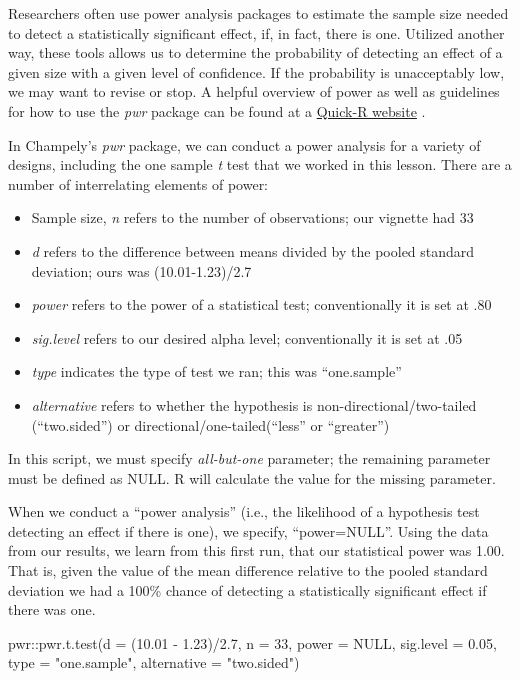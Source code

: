 \documentclass[
  11pt,
]{book}
\newenvironment{Shaded}{\begin{snugshade}}{\end{snugshade}}
\newcommand{\AttributeTok}[1]{\textcolor[rgb]{0.77,0.63,0.00}{#1}}
\newcommand{\ConstantTok}[1]{\textcolor[rgb]{0.00,0.00,0.00}{#1}}
\newcommand{\DecValTok}[1]{\textcolor[rgb]{0.00,0.00,0.81}{#1}}
\newcommand{\FloatTok}[1]{\textcolor[rgb]{0.00,0.00,0.81}{#1}}
\newcommand{\FunctionTok}[1]{\textcolor[rgb]{0.00,0.00,0.00}{#1}}
\newcommand{\NormalTok}[1]{#1}
\newcommand{\SpecialCharTok}[1]{\textcolor[rgb]{0.00,0.00,0.00}{#1}}
\newcommand{\StringTok}[1]{\textcolor[rgb]{0.31,0.60,0.02}{#1}}
\providecommand{\tightlist}{%
  \setlength{\itemsep}{0pt}\setlength{\parskip}{0pt}}
\begin{document}
Researchers often use power analysis packages to estimate the sample size needed to detect a statistically significant effect, if, in fact, there is one. Utilized another way, these tools allows us to determine the probability of detecting an effect of a given size with a given level of confidence. If the probability is unacceptably low, we may want to revise or stop. A helpful overview of power as well as guidelines for how to use the \emph{pwr} package can be found at a \href{https://www.statmethods.net/stats/power.html}{Quick-R website} \citep{kabacoff_power_2017}.

In Champely's \emph{pwr} package, we can conduct a power analysis for a variety of designs, including the one sample \emph{t} test that we worked in this lesson. There are a number of interrelating elements of power:

\begin{itemize}
\tightlist
\item
  Sample size, \emph{n} refers to the number of observations; our vignette had 33
\item
  \emph{d} refers to the difference between means divided by the pooled standard deviation; ours was (10.01-1.23)/2.7
\item
  \emph{power} refers to the power of a statistical test; conventionally it is set at .80
\item
  \emph{sig.level} refers to our desired alpha level; conventionally it is set at .05
\item
  \emph{type} indicates the type of test we ran; this was ``one.sample''
\item
  \emph{alternative} refers to whether the hypothesis is non-directional/two-tailed (``two.sided'') or directional/one-tailed(``less'' or ``greater'')
\end{itemize}

In this script, we must specify \emph{all-but-one} parameter; the remaining parameter must be defined as NULL. R will calculate the value for the missing parameter.

When we conduct a ``power analysis'' (i.e., the likelihood of a hypothesis test detecting an effect if there is one), we specify, ``power=NULL''. Using the data from our results, we learn from this first run, that our statistical power was 1.00. That is, given the value of the mean difference relative to the pooled standard deviation we had a 100\% chance of detecting a statistically significant effect if there was one.

\begin{Shaded}
\begin{Highlighting}[]
\NormalTok{pwr}\SpecialCharTok{::}\FunctionTok{pwr.t.test}\NormalTok{(}\AttributeTok{d =}\NormalTok{ (}\FloatTok{10.01} \SpecialCharTok{{-}} \FloatTok{1.23}\NormalTok{)}\SpecialCharTok{/}\FloatTok{2.7}\NormalTok{, }\AttributeTok{n =} \DecValTok{33}\NormalTok{, }\AttributeTok{power =} \ConstantTok{NULL}\NormalTok{, }\AttributeTok{sig.level =} \FloatTok{0.05}\NormalTok{,}
    \AttributeTok{type =} \StringTok{"one.sample"}\NormalTok{, }\AttributeTok{alternative =} \StringTok{"two.sided"}\NormalTok{)}
\end{Highlighting}
\end{Shaded}
\end{document}
